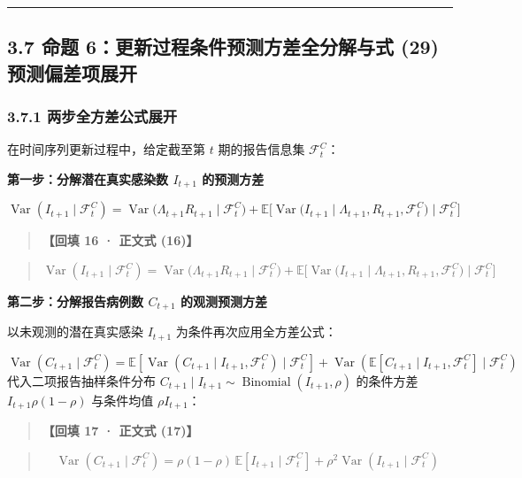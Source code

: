 \documentclass[11pt,a4paper]{ctexart}
\begin{document}
\vspace{0.8em}\hrule\vspace{0.8em}

\subsection{3.7 命题 6：更新过程条件预测方差全分解与式 (29) 预测偏差项展开}

\subsubsection{3.7.1 两步全方差公式展开}
在时间序列更新过程中，给定截至第 $t$ 期的报告信息集 $\mathcal{F}_t^C$：


\textbf{第一步：分解潜在真实感染数 $I_{t+1}$ 的预测方差}

\[
\operatorname{Var}(I_{t+1} \mid \mathcal{F}_t^C) = \operatorname{Var}\big(\Lambda_{t+1} R_{t+1} \;\big|\; \mathcal{F}_t^C\big) + \mathbb{E}\Big[\operatorname{Var}\big(I_{t+1} \;\big|\; \Lambda_{t+1}, R_{t+1}, \mathcal{F}_t^C\big) \;\Big|\; \mathcal{F}_t^C\Big]
\]

\begin{quote}\small\color{black!75}
\textbf{【回填 16 · 正文式 (16)】}
\end{quote}
\begin{quote}\small\color{black!75}
\begin{equation*}
\operatorname{Var}(I_{t+1} \mid \mathcal{F}_t^C) = \operatorname{Var}\big(\Lambda_{t+1} R_{t+1} \;\big|\; \mathcal{F}_t^C\big) + \mathbb{E}\Big[\operatorname{Var}\big(I_{t+1} \;\big|\; \Lambda_{t+1}, R_{t+1}, \mathcal{F}_t^C\big) \;\Big|\; \mathcal{F}_t^C\Big] \tag{eq:var\_I\_decomp}
\end{equation*}
\end{quote}

\textbf{第二步：分解报告病例数 $C_{t+1}$ 的观测预测方差}

以未观测的潜在真实感染 $I_{t+1}$ 为条件再次应用全方差公式：

\[
\operatorname{Var}(C_{t+1} \mid \mathcal{F}_t^C) = \mathbb{E}[\operatorname{Var}(C_{t+1} \mid I_{t+1}, \mathcal{F}_t^C) \mid \mathcal{F}_t^C] + \operatorname{Var}(\mathbb{E}[C_{t+1} \mid I_{t+1}, \mathcal{F}_t^C] \mid \mathcal{F}_t^C)
\]
代入二项报告抽样条件分布 $C_{t+1} \mid I_{t+1} \sim \operatorname{Binomial}(I_{t+1}, \rho)$ 的条件方差 $I_{t+1}\rho(1-\rho)$ 与条件均值 $\rho I_{t+1}$：


\begin{quote}\small\color{black!75}
\textbf{【回填 17 · 正文式 (17)】}
\end{quote}
\begin{quote}\small\color{black!75}
\begin{equation*}
\operatorname{Var}(C_{t+1} \mid \mathcal{F}_t^C) = \rho(1 - \rho)\,\mathbb{E}[I_{t+1} \mid \mathcal{F}_t^C] + \rho^2 \operatorname{Var}(I_{t+1} \mid \mathcal{F}_t^C) \tag{eq:var\_C\_decomp}
\end{equation*}
\end{quote}
\end{document}
